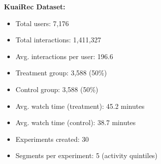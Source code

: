 \documentclass[11pt,twocolumn]{article}
\begin{document}
\textbf{KuaiRec Dataset:}
\begin{itemize}
    \item Total users: 7,176
    \item Total interactions: 1,411,327
    \item Avg. interactions per user: 196.6
    \item Treatment group: 3,588 (50\%)
    \item Control group: 3,588 (50\%)
    \item Avg. watch time (treatment): 45.2 minutes
    \item Avg. watch time (control): 38.7 minutes
    \item Experiments created: 30
    \item Segments per experiment: 5 (activity quintiles)
\end{itemize}
\end{document}
